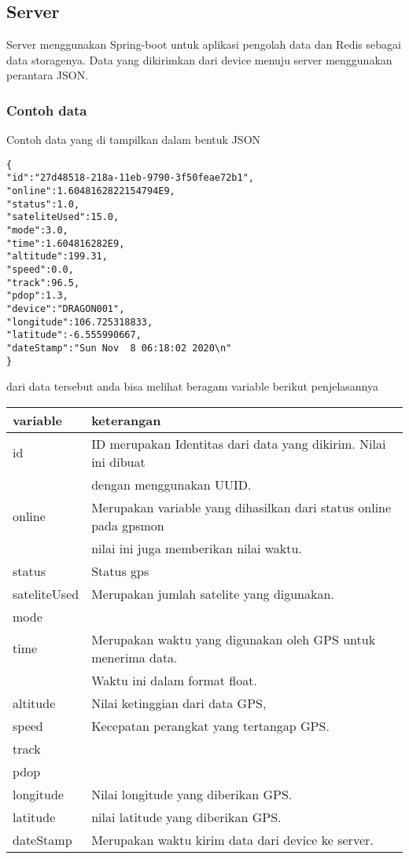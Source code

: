 \documentclass[11pt]{article}
\begin{document}
\subsection{Server}
\label{sec:orgea730b5}
Server menggunakan Spring-boot untuk aplikasi pengolah data dan Redis sebagai data
storagenya. Data yang dikirimkan dari device menuju server menggunakan perantara 
JSON. 
\subsubsection{Contoh data}
\label{sec:orga5539fc}
Contoh data yang di tampilkan dalam bentuk JSON
\begin{verbatim}
{ 
"id":"27d48518-218a-11eb-9790-3f50feae72b1",
"online":1.6048162822154794E9,
"status":1.0,
"sateliteUsed":15.0,
"mode":3.0,
"time":1.604816282E9,
"altitude":199.31,
"speed":0.0,
"track":96.5,
"pdop":1.3,
"device":"DRAGON001",
"longitude":106.725318833,
"latitude":-6.555990667,
"dateStamp":"Sun Nov  8 06:18:02 2020\n"
}
\end{verbatim}
dari data tersebut anda bisa melihat beragam variable berikut penjelasannya
\begin{center}
\begin{tabular}{ll}
\hline
variable & keterangan\\
\hline
id & ID merupakan Identitas dari data yang dikirim. Nilai ini dibuat\\
 & dengan menggunakan UUID.\\
online & Merupakan variable yang dihasilkan dari status online pada gpsmon\\
 & nilai ini juga memberikan nilai waktu.\\
status & Status gps\\
sateliteUsed & Merupakan jumlah satelite yang digunakan.\\
mode & \\
time & Merupakan waktu yang digunakan oleh GPS untuk menerima data.\\
 & Waktu ini dalam format float.\\
altitude & Nilai ketinggian dari data GPS,\\
speed & Kecepatan perangkat yang tertangap GPS.\\
track & \\
pdop & \\
longitude & Nilai longitude yang diberikan GPS.\\
latitude & nilai latitude yang diberikan GPS.\\
dateStamp & Merupakan waktu kirim data dari device ke server.\\
\hline
\end{tabular}
\end{center}
\end{document}
